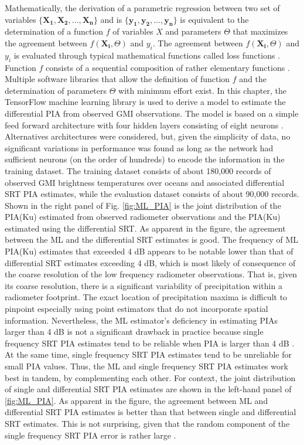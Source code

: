 \documentclass[10pt]{ietbook}
\begin{document}
Mathematically, the derivation of a parametric regression between two set of variables $\{\mathbf{X_1,X_2,...,X_n}\}$ and is $\{\mathbf{y_1,y_2,...,y_n}\}$ is 
equivalent to the determination of a function $f$ of variables $X$ and parameters $\Theta$ that maximizes the agreement between $f(\mathbf{ X_i},\Theta)$ and $y_i$.
The agreement between $f(\mathbf{ X_i},\Theta)$ and $y_i$ is evaluated through typical mathematical functions called loss functions \cite{deeplearning2016}.
Function $f$ consists of a sequential composition of rather elementary functions \cite{deeplearning2016}.
Multiple software libraries that allow the definition of function $f$ and the determination of parameters $\Theta$ with minimum effort exist.  In this 
chapter, the TensorFlow machine learning library \cite{tensorflow2015} is used to derive a model to estimate the differential PIA from observed GMI observations.
The model is based on a simple feed forward architecture with four hidden layers consisting of eight neurons \cite{deeplearning2016}.
Alternatives architectures were considered,
but, given the simplicity of data, no significant variations in performance was found as long as the network had sufficient neurons (on the order of hundreds)
to encode the information in the training dataset.  The training dataset consists of about 180,000 records of observed GMI brightness temperatures over 
oceans and associated differential SRT PIA estimates, while the evaluation dataset consists of about 90,000 records.  Shown in the right panel of Fig. \ref{fig:ML_PIA} 
is the joint distribution of the PIA(Ku) estimated from observed radiometer observations and the PIA(Ku) estimated using the differential SRT. As apparent
in the figure, the agreement between the ML and the differential SRT estimates is good.  The frequency of ML PIA(Ku) 
estimates that exceeded 4 dB appears to be
notable lower than that of differential SRT estimates exceeding 4 dB, which is most likely of consequence of the coarse resolution of the low frequency
radiometer observations.  That is, given its coarse resolution, there is a significant variability of precipitation within
a radiometer footprint.  The exact
location of precipitation maxima is difficult to pinpoint especially using point estimators that do not incorporate spatial
information.  Nevertheless, the ML estimator's deficiency
in estimating PIAs larger than 4 dB is not a significant drawback in practice because single frequency SRT PIA estimates tend to be reliable when PIA is larger
than 4 dB  \cite{meneghini2000}.  At the same time, single frequency SRT PIA estimates tend to be unreliable for small PIA values.  Thus, the ML and single frequency SRT PIA estimates 
work best in tandem, by complementing each other.  For context, the joint distribution of single and differential SRT PIA estimates are shown in the left-hand
panel of \ref{fig:ML_PIA}.  As apparent in the figure, the agreement between ML and differential SRT PIA estimates is better than that between 
single and differential SRT estimates.  This is not surprising, given that the random component of the single frequency SRT PIA error is rather large 
\cite{meneghini2000}.
\end{document}
